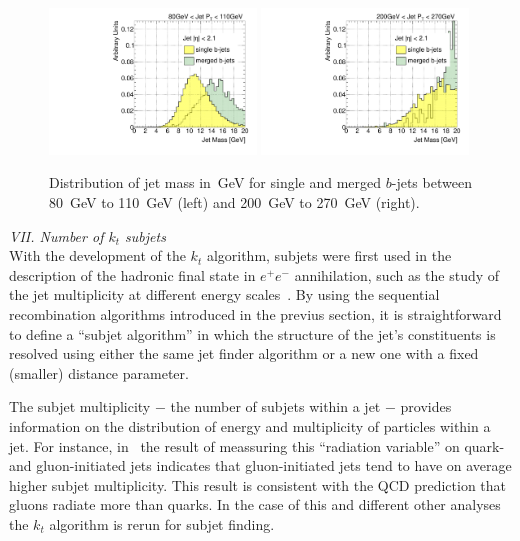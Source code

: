 \begin{figure}[tp]
\centering
\includegraphics[width=0.49\textwidth]{FIGS/VarsSingleMerged/JetMass080.pdf}
\includegraphics[width=0.49\textwidth]{FIGS/VarsSingleMerged/JetMass200.pdf}
\caption{Distribution of jet mass in~GeV for single and merged $b$-jets between 80~GeV to 110~GeV (left) and 200~GeV to 270~GeV (right).}
\label{fig:masssinglemerged}
\end{figure}



{ \em VII. Number of $k_t$ subjets}
\\[3mm]

With the development of the $k_t$ algorithm, subjets were first used in the description of the hadronic final state in $e^+e^-$ annihilation, such as the study of the jet multiplicity at different energy scales~\cite{Catani1992445}. By using the sequential recombination algorithms introduced in the previus section, it is straightforward to define a ``subjet algorithm'' in which the structure of the jet's constituents is resolved using either the same jet finder algorithm or a new one with a fixed (smaller) distance parameter.

The subjet multiplicity $-$ the number of subjets within a jet $-$ provides information on the distribution of energy and multiplicity of particles within a jet. For instance, in~\cite{Snihur1999494} the result of meassuring this ``radiation variable'' on quark- and gluon-initiated jets indicates that gluon-initiated jets tend to have on average higher subjet multiplicity. This result is consistent with the QCD prediction that gluons radiate more than quarks. In the case of this and different other analyses %
the $k_t$ algorithm is rerun for subjet finding.

